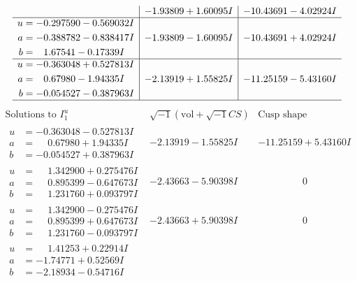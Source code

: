 \documentclass[1p]{elsarticle_modified}
\theoremstyle{definition}
\newcommand{\I}{\sqrt{-1}}
\begin{document}
$$\begin{array}{c|c|c}
 & -1.93809 + 1.60095 I & -10.43691 - 4.02924 I \\ \hline\begin{aligned}
u &= -0.297590 - 0.569032 I \\
a &= -0.388782 - 0.838417 I \\
b &= \phantom{-}1.67541 - 0.17339 I\end{aligned}
 & -1.93809 - 1.60095 I & -10.43691 + 4.02924 I \\ \hline\begin{aligned}
u &= -0.363048 + 0.527813 I \\
a &= \phantom{-}0.67980 - 1.94335 I \\
b &= -0.054527 - 0.387963 I\end{aligned}
 & -2.13919 + 1.55825 I & -11.25159 - 5.43160 I\\
 \hline 
 \end{array}$$\newpage$$\begin{array}{c|c|c}  
\text{Solutions to }I^u_{1}& \I (\text{vol} + \sqrt{-1}CS) & \text{Cusp shape}\\
 \hline 
\begin{aligned}
u &= -0.363048 - 0.527813 I \\
a &= \phantom{-}0.67980 + 1.94335 I \\
b &= -0.054527 + 0.387963 I\end{aligned}
 & -2.13919 - 1.55825 I & -11.25159 + 5.43160 I \\ \hline\begin{aligned}
u &= \phantom{-}1.342900 + 0.275476 I \\
a &= \phantom{-}0.895399 - 0.647673 I \\
b &= \phantom{-}1.231760 + 0.093797 I\end{aligned}
 & -2.43663 - 5.90398 I & \phantom{-0.000000 } 0 \\ \hline\begin{aligned}
u &= \phantom{-}1.342900 - 0.275476 I \\
a &= \phantom{-}0.895399 + 0.647673 I \\
b &= \phantom{-}1.231760 - 0.093797 I\end{aligned}
 & -2.43663 + 5.90398 I & \phantom{-0.000000 } 0 \\ \hline\begin{aligned}
u &= \phantom{-}1.41253 + 0.22914 I \\
a &= -1.74771 + 0.52569 I \\
b &= -2.18934 - 0.54716 I\end{aligned}

\end{array}$$
\end{document}
